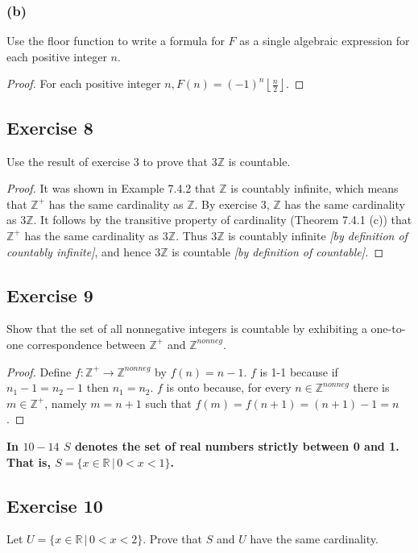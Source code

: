 \documentclass[14pt]{extarticle}
\newcommand{\dps}{\displaystyle}
\newcommand{\R}{\mathbb{R}}
\newcommand{\Z}{\mathbb{Z}}
\newcommand{\cy}{\color{cyan}}
\newcommand{\floor}[1]{{\left\lfloor#1\right\rfloor}}
\begin{document}
\subsubsection{(b)}
Use the floor function to write a formula for $F$ as a single algebraic expression for each positive integer $n$.

\begin{proof}
    For each positive integer \(\dps n, F(n) = (-1)^n \floor{ \frac{n}{2}}\).
\end{proof}

\subsection{Exercise 8}
Use the result of exercise 3 to prove that $3\Z$ is countable.

\begin{proof}
    It was shown in Example 7.4.2 that $\Z$ is countably infinite, which means that $\Z^+$ has the same cardinality
    as $\Z$. By exercise 3, $\Z$ has the same cardinality as $3\Z$. It follows by the transitive property of cardinality
    (Theorem 7.4.1 (c)) that $\Z^+$ has the same cardinality as $3\Z$. Thus $3\Z$ is countably infinite {\it [by definition
                of countably infinite]}, and hence $3\Z$ is countable {\it [by definition of countable].}
\end{proof}

\subsection{Exercise 9}
Show that the set of all nonnegative integers is countable by exhibiting a one-to-one correspondence between $\Z^+$
and \(\Z^{nonneg}\).

\begin{proof}
    Define \(f: \Z^+ \to \Z^{nonneg}\) by \(f(n) = n-1\). $f$ is 1-1 because if \(n_1 - 1 = n_2 - 1\) then \(n_1 = n_2\).
    $f$ is onto because, for every \(n \in \Z^{nonneg}\) there is \(m \in \Z^+\), namely \(m = n+1\) such that
    \(f(m) = f(n+1) = (n+1)-1 = n\).
\end{proof}

{\bf \cy In $10-14$ $S$ denotes the set of real numbers strictly between 0 and 1. That is, \(S = \{x \in \R \, | \,
0 < x < 1\}\).}

\subsection{Exercise 10}
Let \(U = \{x \in \R \,|\, 0 < x < 2\}\). Prove that $S$ and $U$ have the same cardinality.
\end{document}
